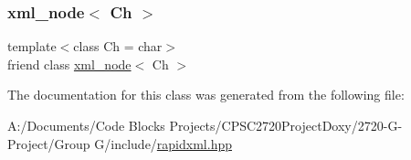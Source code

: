 \subsubsection{\texorpdfstring{xml\+\_\+node$<$ Ch $>$}{xml\_node< Ch >}}
{\footnotesize\ttfamily template$<$class Ch = char$>$ \\
friend class \mbox{\hyperlink{classrapidxml_1_1xml__node}{xml\+\_\+node}}$<$ Ch $>$\hspace{0.3cm}{\ttfamily [friend]}}



The documentation for this class was generated from the following file\+:\begin{DoxyCompactItemize}
\item 
A\+:/\+Documents/\+Code Blocks Projects/\+C\+P\+S\+C2720\+Project\+Doxy/2720-\/\+G-\/\+Project/\+Group G/include/\mbox{\hyperlink{include_2rapidxml_8hpp}{rapidxml.\+hpp}}\end{DoxyCompactItemize}
